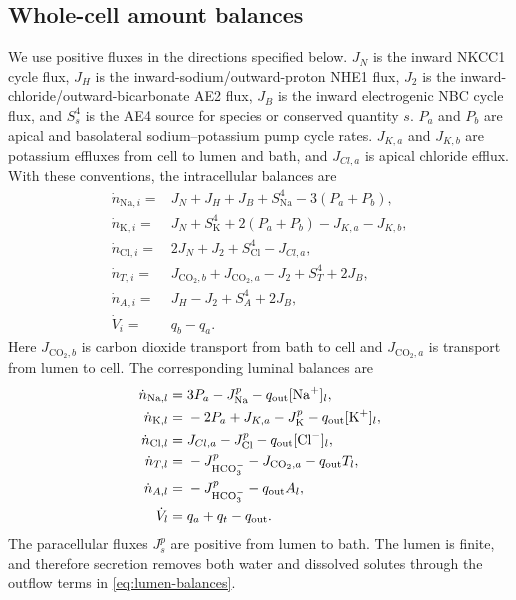 \subsection{Whole-cell amount balances}

We use positive fluxes in the directions specified below. $J_N$ is the inward NKCC1 cycle flux, $J_H$ is the inward-sodium/outward-proton NHE1 flux, $J_2$ is the inward-chloride/outward-bicarbonate AE2 flux, $J_B$ is the inward electrogenic NBC cycle flux, and $S^4_s$ is the AE4 source for species or conserved quantity $s$. $P_a$ and $P_b$ are apical and basolateral sodium--potassium pump cycle rates. $J_{K,a}$ and $J_{K,b}$ are potassium effluxes from cell to lumen and bath, and $J_{Cl,a}$ is apical chloride efflux. With these conventions, the intracellular balances are
\begin{equation}
\begin{aligned}
\dot n_{\mathrm{Na},i}={}&J_N+J_H+J_B+S^4_{\mathrm{Na}}-3(P_a+P_b),\\
\dot n_{\mathrm{K},i}={}&J_N+S^4_{\mathrm K}+2(P_a+P_b)-J_{K,a}-J_{K,b},\\
\dot n_{\mathrm{Cl},i}={}&2J_N+J_2+S^4_{\mathrm{Cl}}-J_{Cl,a},\\
\dot n_{T,i}={}&J_{\mathrm{CO}_2,b}+J_{\mathrm{CO}_2,a}-J_2+S^4_T+2J_B,\\
\dot n_{A,i}={}&J_H-J_2+S^4_A+2J_B,\\
\dot V_i={}&q_b-q_a.
\end{aligned}
\label{eq:cell-balances}
\end{equation}
Here $J_{\mathrm{CO}_2,b}$ is carbon dioxide transport from bath to cell and $J_{\mathrm{CO}_2,a}$ is transport from lumen to cell. The corresponding luminal balances are
\begin{equation}
\begin{aligned}
\dot n_{\mathrm{Na},l}={}&3P_a-J^p_{\mathrm{Na}}-q_{\mathrm{out}}[\mathrm{Na}^{+}]_l,\\
\dot n_{\mathrm{K},l}={}&-2P_a+J_{K,a}-J^p_{\mathrm K}-q_{\mathrm{out}}[\mathrm{K}^{+}]_l,\\
\dot n_{\mathrm{Cl},l}={}&J_{Cl,a}-J^p_{\mathrm{Cl}}-q_{\mathrm{out}}[\mathrm{Cl}^{-}]_l,\\
\dot n_{T,l}={}&-J^p_{\mathrm{HCO}_{3}^{-}}-J_{\mathrm{CO}_2,a}-q_{\mathrm{out}}T_l,\\
\dot n_{A,l}={}&-J^p_{\mathrm{HCO}_{3}^{-}}-q_{\mathrm{out}}A_l,\\
\dot V_l={}&q_a+q_t-q_{\mathrm{out}}.
\end{aligned}
\label{eq:lumen-balances}
\end{equation}
The paracellular fluxes $J^p_s$ are positive from lumen to bath. The lumen is finite, and therefore secretion removes both water and dissolved solutes through the outflow terms in \cref{eq:lumen-balances}.

